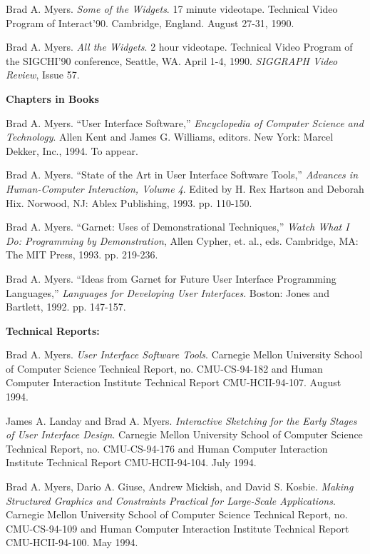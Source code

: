 Brad A. Myers. {\it Some of the Widgets}.  17 minute videotape.
Technical Video Program of Interact'90.  Cambridge, England. August
27-31, 1990.

Brad A. Myers. {\it All the Widgets}.  2 hour videotape.  Technical
Video Program of the SIGCHI'90 conference, Seattle, WA.  April 1-4,
1990.  {\it SIGGRAPH Video Review}, Issue 57.



{\bf Chapters in Books}


Brad A. Myers. ``User Interface Software,'' {\it Encyclopedia of Computer
Science and Technology}.  Allen Kent and James G. Williams, editors.
New York: Marcel Dekker, Inc., 1994. To appear.

Brad A. Myers. ``State of the Art in User Interface Software Tools,''
{\it Advances in Human-Computer Interaction, Volume 4}.
Edited by H. Rex Hartson and Deborah Hix.  Norwood, NJ: Ablex
Publishing, 1993.  pp. 110-150.

Brad A. Myers.  ``Garnet: Uses of Demonstrational Techniques,''
{\it Watch What I Do: Programming by Demonstration}, Allen Cypher, et. al., eds.
Cambridge, MA: The MIT Press, 1993.  pp. 219-236.

Brad A. Myers.  ``Ideas from Garnet for Future User Interface
Programming Languages,''
{\it Languages for Developing User Interfaces}. Boston: Jones and Bartlett,
1992.  pp. 147-157.


{\bf Technical Reports:}


Brad A. Myers.  {\it User Interface Software Tools}. Carnegie Mellon University
School of Computer Science Technical Report, no. CMU-CS-94-182 and
Human Computer Interaction Institute Technical Report CMU-HCII-94-107.
August 1994.

James A. Landay and Brad A. Myers.  {\it Interactive Sketching for the
Early Stages of User Interface Design}.  Carnegie Mellon University
School of Computer Science Technical Report, no. CMU-CS-94-176 and
Human Computer Interaction Institute Technical Report CMU-HCII-94-104.
July 1994.

Brad A. Myers, Dario A. Giuse, Andrew Mickish, and David S. Kosbie.
{\it Making Structured Graphics and Constraints Practical for
Large-Scale Applications}.  Carnegie Mellon University School of
Computer Science Technical Report, no. CMU-CS-94-109 and Human
Computer Interaction Institute Technical Report CMU-HCII-94-100.  May
1994.


